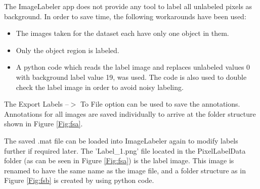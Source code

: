 The ImageLabeler app does not provide any tool to label all unlabeled pixels as background. In order to save time, the following workarounds have been used:
	\begin{itemize}
		\item The images taken for the dataset each have only one object in them.
		\item Only the object region is labeled.
		\item A python code which reads the label image and replaces unlabeled values 0 with background label value 19, was used. The code is also used to double check the label image in order to avoid noisy labeling.
	\end{itemize}
	
The Export Labels --$>$ To File option can be used to save the annotations. Annotations for all images are saved individually to arrive at the folder structure shown in Figure \ref{Fig:fsa}.
	
The saved .mat file can be loaded into ImageLabeler again to modify labels further if required later. The 'Label\_1.png' file located in the PixelLabelData folder (as can be seen in Figure  \ref{Fig:fsa}) is the label image. This image is renamed to have the same name as the image file, and a folder structure as in Figure \ref{Fig:fsb} is created by using python code.
	
